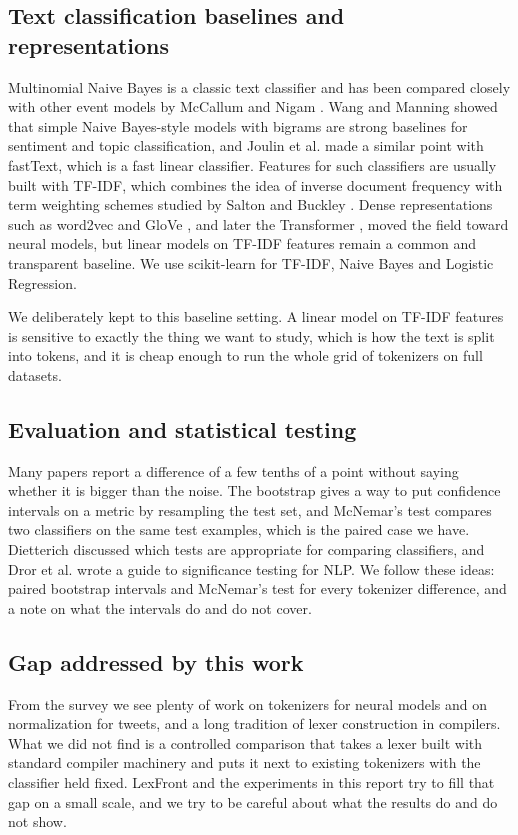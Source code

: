 \documentclass[journal,a4paper]{IEEEtran}
\begin{document}
\subsection{Text classification baselines and representations}\label{sec:2.4}
Multinomial Naive Bayes is a classic text classifier and has been compared closely with other event models by McCallum and Nigam \cite{r27}. Wang and Manning \cite{r28} showed that simple Naive Bayes-style models with bigrams are strong baselines for sentiment and topic classification, and Joulin et al. \cite{r29} made a similar point with fastText, which is a fast linear classifier. Features for such classifiers are usually built with TF-IDF, which combines the idea of inverse document frequency \cite{r30} with term weighting schemes studied by Salton and Buckley \cite{r31}. Dense representations such as word2vec \cite{r32} and GloVe \cite{r33}, and later the Transformer \cite{r34}, moved the field toward neural models, but linear models on TF-IDF features remain a common and transparent baseline. We use scikit-learn \cite{r35} for TF-IDF, Naive Bayes and Logistic Regression.

We deliberately kept to this baseline setting. A linear model on TF-IDF features is sensitive to exactly the thing we want to study, which is how the text is split into tokens, and it is cheap enough to run the whole grid of tokenizers on full datasets.

\subsection{Evaluation and statistical testing}\label{sec:2.5}
Many papers report a difference of a few tenths of a point without saying whether it is bigger than the noise. The bootstrap \cite{r36} gives a way to put confidence intervals on a metric by resampling the test set, and McNemar's test \cite{r37} compares two classifiers on the same test examples, which is the paired case we have. Dietterich \cite{r38} discussed which tests are appropriate for comparing classifiers, and Dror et al. \cite{r39} wrote a guide to significance testing for NLP. We follow these ideas: paired bootstrap intervals and McNemar's test for every tokenizer difference, and a note on what the intervals do and do not cover.

\subsection{Gap addressed by this work}\label{sec:2.6}
From the survey we see plenty of work on tokenizers for neural models and on normalization for tweets, and a long tradition of lexer construction in compilers. What we did not find is a controlled comparison that takes a lexer built with standard compiler machinery and puts it next to existing tokenizers with the classifier held fixed. LexFront and the experiments in this report try to fill that gap on a small scale, and we try to be careful about what the results do and do not show.
\end{document}
